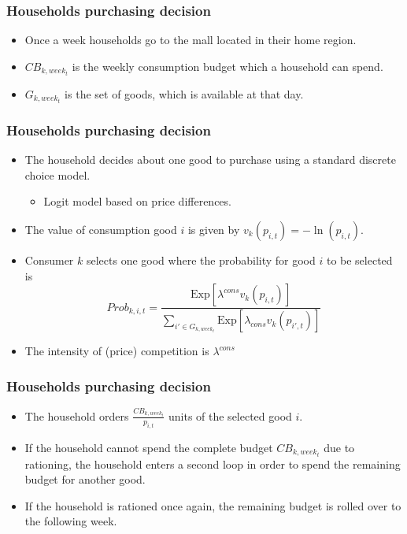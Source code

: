 \documentclass{beamer}
\begin{document}
\frame
{

  \frametitle{Households purchasing decision} 
\begin{itemize}

\item Once a week households go to the  mall located in their home region.

\item $CB_{k,week_t}$ is the weekly consumption budget which a household can spend. 

\item $G_{k,week_t}$ is the set of goods, which is available at that day.


\end{itemize}

  
}



\frame
{

 \frametitle{Households purchasing decision} 
\begin{itemize}
	\item The household decides about one good to purchase using a standard discrete choice model.
	
\begin{itemize}
	\item  Logit model based on price differences.
\end{itemize}
	\item The value of consumption good $i$ is given by $v_k(p_{i,t})=-\ln(p_{i,t}).$
	\item Consumer $k$ selects one good where the probability for good $i$ to be selected is
	\[
	Prob_{k,i,t} = \frac{\mbox{Exp}[\lambda^{cons}
v_{k}(p_{i,t})]}{\sum_{i' \in G_{k,week_t}}
\mbox{Exp}[\lambda_{cons} v_{k}(p_{i',t})]}
	\]
	\item The intensity of (price) competition is $\lambda^{cons}$


\end{itemize}


}
\frame
{

  \frametitle{Households purchasing decision} 
\begin{itemize}

\item The household orders $\frac{CB_{k,week_t}}{p_{i,t}}$ units of the selected good $i$.
\item If the household cannot spend the complete budget $CB_{k,week_t}$
due to rationing, the household enters a second loop in
order to spend the remaining budget for another good.
\item If the household is rationed once again, the remaining budget
is rolled over to the following week.

\end{itemize}
 
  
}
\end{document}
